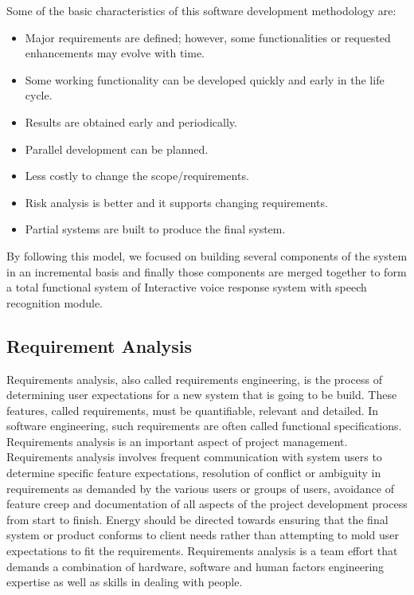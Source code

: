 Some of the basic characteristics of this software development methodology are:
\begin{itemize}
	\item Major requirements are defined; however, some functionalities or requested enhancements may evolve with time.
	\item Some working functionality can be developed quickly and early in the life cycle.
	\item Results are obtained early and periodically.
	\item Parallel development can be planned.
	\item Less costly to change the scope/requirements.
	\item Risk analysis is better and it supports changing requirements.
	\item Partial systems are built to produce the final system.
\end{itemize}

By following this model, we focused on building several components of the system in an incremental basis and finally those components are merged together to form a total functional system of Interactive voice response system with speech recognition module.


\subsection{Requirement Analysis}
Requirements analysis, also called requirements engineering, is the process of determining user expectations for a new system that is going to be build. These features, called requirements, must be quantifiable, relevant and detailed. In software engineering, such requirements are often called functional specifications. Requirements analysis is an important aspect of project management.
Requirements analysis involves frequent communication with system users to determine specific feature expectations, resolution of conflict or ambiguity in requirements as demanded by the various users or groups of users, avoidance of feature creep and documentation of all aspects of the project development process from start to finish. Energy should be directed towards ensuring that the final system or product conforms to client needs rather than attempting to mold user expectations to fit the requirements. Requirements analysis is a team effort that demands a combination of hardware, software and human factors engineering expertise as well as skills in dealing with people.

